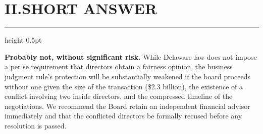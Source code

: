 \section*{II.\quad SHORT ANSWER}

{\color{rule}\hrule height 0.5pt}\vspace{6pt}

\textbf{Probably not, without significant risk.} While Delaware law does not impose a per se requirement that directors obtain a fairness opinion, the business judgment rule's protection will be substantially weakened if the board proceeds without one given the size of the transaction (\$2.3 billion), the existence of a conflict involving two inside directors, and the compressed timeline of the negotiations.  We recommend the Board retain an independent financial advisor immediately and that the conflicted directors be formally recused before any resolution is passed.

\vspace{10pt}

